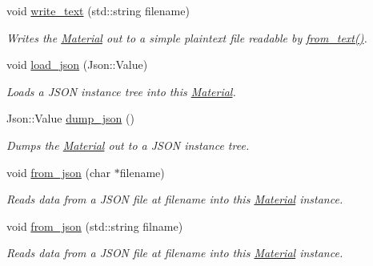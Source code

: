 \begin{DoxyCompactItemize}
void \hyperlink{classpyne_1_1_material_a70706c2bc1f4776ea25932e1a5b2642b}{write\+\_\+text} (std\+::string filename)
\begin{DoxyCompactList}\small\item\em Writes the \hyperlink{classpyne_1_1_material}{Material} out to a simple plaintext file readable by \hyperlink{classpyne_1_1_material_a28d8f7a7b06110a8be097c8e7b1fc59a}{from\+\_\+text()}. \end{DoxyCompactList}\item 
\mbox{\label{classpyne_1_1_material_a4647c1131cc8940a5e47aa2f42bf8e88}} 
void \hyperlink{classpyne_1_1_material_a4647c1131cc8940a5e47aa2f42bf8e88}{load\+\_\+json} (Json\+::\+Value)
\begin{DoxyCompactList}\small\item\em Loads a J\+S\+ON instance tree into this \hyperlink{classpyne_1_1_material}{Material}. \end{DoxyCompactList}\item 
\mbox{\label{classpyne_1_1_material_af60262ec849d03e9682f9e90542a6e30}} 
Json\+::\+Value \hyperlink{classpyne_1_1_material_af60262ec849d03e9682f9e90542a6e30}{dump\+\_\+json} ()
\begin{DoxyCompactList}\small\item\em Dumps the \hyperlink{classpyne_1_1_material}{Material} out to a J\+S\+ON instance tree. \end{DoxyCompactList}\item 
\mbox{\label{classpyne_1_1_material_a7a78cc895526f4f4860639c29105a73c}} 
void \hyperlink{classpyne_1_1_material_a7a78cc895526f4f4860639c29105a73c}{from\+\_\+json} (char $\ast$filename)
\begin{DoxyCompactList}\small\item\em Reads data from a J\+S\+ON file at {\itshape filename} into this \hyperlink{classpyne_1_1_material}{Material} instance. \end{DoxyCompactList}\item 
\mbox{\label{classpyne_1_1_material_a8c9791e530b68bd2aace37380aa9a437}} 
void \hyperlink{classpyne_1_1_material_a8c9791e530b68bd2aace37380aa9a437}{from\+\_\+json} (std\+::string filname)
\begin{DoxyCompactList}\small\item\em Reads data from a J\+S\+ON file at {\itshape filename} into this \hyperlink{classpyne_1_1_material}{Material} instance. \end{DoxyCompactList}\item 

\end{DoxyCompactItemize}
